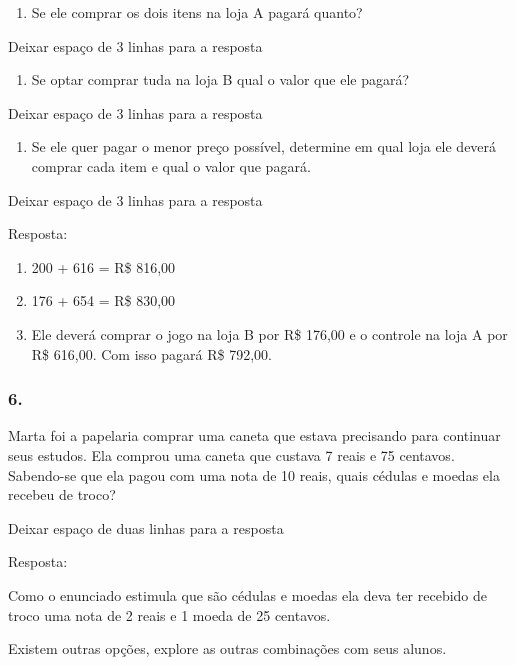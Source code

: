 \begin{enumerate}
\def\labelenumi{\alph{enumi})}
\item
  Se ele comprar os dois itens na loja A pagará quanto?
\end{enumerate}

Deixar espaço de 3 linhas para a resposta

\begin{enumerate}
\def\labelenumi{\alph{enumi})}
\item
  Se optar comprar tuda na loja B qual o valor que ele pagará?
\end{enumerate}

Deixar espaço de 3 linhas para a resposta

\begin{enumerate}
\def\labelenumi{\alph{enumi})}
\item
  Se ele quer pagar o menor preço possível, determine em qual loja ele
  deverá comprar cada item e qual o valor que pagará.
\end{enumerate}

Deixar espaço de 3 linhas para a resposta

Resposta:

\begin{enumerate}
\def\labelenumi{\alph{enumi})}
\item
  200 + 616 = R\$ 816,00
\item
  176 + 654 = R\$ 830,00
\item
  Ele deverá comprar o jogo na loja B por R\$ 176,00 e o controle na
  loja A por R\$ 616,00. Com isso pagará R\$ 792,00.
\end{enumerate}

\subsubsection{6.}\label{section-85}

Marta foi a papelaria comprar uma caneta que estava precisando para
continuar seus estudos. Ela comprou uma caneta que custava 7 reais e 75
centavos. Sabendo-se que ela pagou com uma nota de 10 reais, quais
cédulas e moedas ela recebeu de troco?

Deixar espaço de duas linhas para a resposta

Resposta:

Como o enunciado estimula que são cédulas e moedas ela deva ter recebido
de troco uma nota de 2 reais e 1 moeda de 25 centavos.

Existem outras opções, explore as outras combinações com seus alunos.

